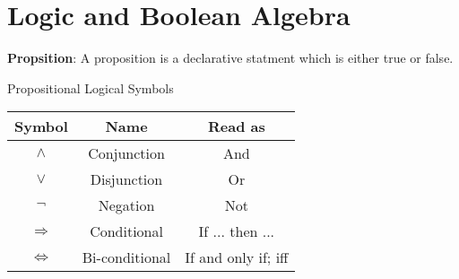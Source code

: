 \section{Logic and Boolean Algebra}

\begin{defn}\label{mod1:defn:Proposition}
   \textbf{Propsition}: A proposition is a declarative statment which is either true or false.
\end{defn}

\begin{defn}\label{mod1:defn:LogicSymbols}
   Propositional Logical Symbols
      
   \begin{table}[ht]
      \centering
      \begin{tabular}{|c|c|c|}
         \hline
            Symbol & Name & Read as\\
         \hline
         $\land$ & Conjunction & And \\
         $\lor$ &   Disjunction & Or \\
         $\lnot$ & Negation & Not\\
         $\Rightarrow$ & Conditional & If ... then ...\\
         $\Leftrightarrow$ & Bi-conditional & If and only if; iff\\
         \hline
      \end{tabular}
      \label{mod1:tab:LogicSymbols}
   \end{table}

\end{defn}      

